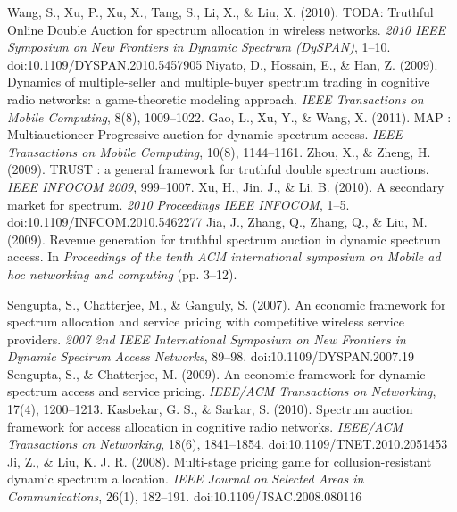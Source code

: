 \begin{thebibliography}{1}
 Wang, S., Xu, P., Xu, X., Tang, S., Li, X., \& Liu, X. (2010). TODA: Truthful Online Double Auction for spectrum allocation in wireless networks. \textit{2010 IEEE Symposium on New Frontiers in Dynamic Spectrum (DySPAN)}, 1–10. doi:10.1109/DYSPAN.2010.5457905
 Niyato, D., Hossain, E., \& Han, Z. (2009). Dynamics of multiple-seller and multiple-buyer spectrum trading in cognitive radio networks: a game-theoretic modeling approach. \textit{IEEE Transactions on Mobile Computing}, 8(8), 1009–1022.
 Gao, L., Xu, Y., \& Wang, X. (2011). MAP : Multiauctioneer Progressive auction for dynamic spectrum access. \textit{IEEE Transactions on Mobile Computing}, 10(8), 1144–1161. 
 Zhou, X., \& Zheng, H. (2009). TRUST : a general framework for truthful double spectrum auctions. \textit{IEEE INFOCOM 2009}, 999–1007.  
 Xu, H., Jin, J., \& Li, B. (2010). A secondary market for spectrum.\textit{ 2010 Proceedings IEEE INFOCOM}, 1–5. doi:10.1109/INFCOM.2010.5462277
 Jia, J., Zhang, Q., Zhang, Q., \& Liu, M. (2009). Revenue generation for truthful spectrum auction in dynamic spectrum access. In \textit{Proceedings of the tenth ACM international symposium on Mobile ad hoc networking and computing} (pp. 3–12). 

 Sengupta, S., Chatterjee, M., \& Ganguly, S. (2007). An economic framework for spectrum allocation and service pricing with competitive wireless service providers. \textit{2007 2nd IEEE International Symposium on New Frontiers in Dynamic Spectrum Access Networks}, 89–98. doi:10.1109/DYSPAN.2007.19
 Sengupta, S., \& Chatterjee, M. (2009). An economic framework for dynamic spectrum access and service pricing.\textit{ IEEE/ACM Transactions on Networking}, 17(4), 1200–1213. 
 Kasbekar, G. S., \& Sarkar, S. (2010). Spectrum auction framework for access allocation in cognitive radio networks. \textit{IEEE/ACM Transactions on Networking}, 18(6), 1841–1854. doi:10.1109/TNET.2010.2051453 
 Ji, Z., \& Liu, K. J. R. (2008). Multi-stage pricing game for collusion-resistant dynamic spectrum allocation. \textit{IEEE Journal on Selected Areas in Communications}, 26(1), 182–191. doi:10.1109/JSAC.2008.080116


\end{thebibliography}
